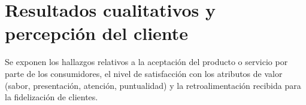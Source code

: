 \section{Resultados cualitativos y percepción del cliente}
\label{sec:resultados_cualitativos}

Se exponen los hallazgos relativos a la aceptación del producto o servicio por parte de los consumidores, el nivel de satisfacción con los atributos de valor (sabor, presentación, atención, puntualidad) y la retroalimentación recibida para la fidelización de clientes.
